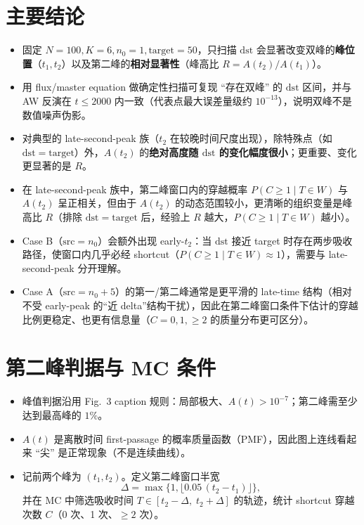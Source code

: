 \documentclass[11pt,fontset=fandol]{ctexart}
\begin{document}
\section{主要结论}
\begin{itemize}
  \item 固定 $N=100,K=6,n_0=1,\mathrm{target}=50$，只扫描 $\mathrm{dst}$ 会显著改变双峰的\textbf{峰位置}（$t_1,t_2$）以及第二峰的\textbf{相对显著性}（峰高比 $R=A(t_2)/A(t_1)$）。
  \item 用 flux/master equation 做确定性扫描可复现 ``存在双峰'' 的 $\mathrm{dst}$ 区间，并与 AW 反演在 $t\le2000$ 内一致（代表点最大误差量级约 $10^{-13}$），说明双峰不是数值噪声伪影。
  \item 对典型的 late-second-peak 族（$t_2$ 在较晚时间尺度出现），除特殊点（如 $\mathrm{dst}=\mathrm{target}$）外，$A(t_2)$ 的\textbf{绝对高度随 $\mathrm{dst}$ 的变化幅度很小}；更重要、变化更显著的是 $R$。
  \item 在 late-second-peak 族中，第二峰窗口内的穿越概率 $P(C\ge1\mid T\in W)$ 与 $A(t_2)$ 呈正相关，但由于 $A(t_2)$ 的动态范围较小，更清晰的组织变量是峰高比 $R$（排除 $\mathrm{dst}=\mathrm{target}$ 后，经验上 $R$ 越大，$P(C\ge1\mid T\in W)$ 越小）。
  \item Case B（$\mathrm{src}=n_0$）会额外出现 early-$t_2$：当 $\mathrm{dst}$ 接近 target 时存在两步吸收路径，使窗口内几乎必经 shortcut（$P(C\ge1\mid T\in W)\approx 1$），需要与 late-second-peak 分开理解。
  \item Case A（$\mathrm{src}=n_0+5$）的第一/第二峰通常是更平滑的 late-time 结构（相对不受 early-peak 的“近 delta”结构干扰），因此在第二峰窗口条件下估计的穿越比例更稳定、也更有信息量（$C=0,1,\ge2$ 的质量分布更可区分）。
\end{itemize}

\section{第二峰判据与 MC 条件}
\begin{itemize}
  \item 峰值判据沿用 Fig.~3 caption 规则：局部极大、$A(t)>10^{-7}$；第二峰需至少达到最高峰的 $1\%$。
  \item $A(t)$ 是离散时间 first-passage 的概率质量函数（PMF），因此图上连线看起来 ``尖'' 是正常现象（不是连续曲线）。
  \item 记前两个峰为 $(t_1,t_2)$。定义第二峰窗口半宽
  \[
    \Delta=\max\{1,\lfloor 0.05\,(t_2-t_1)\rfloor\},
  \]
  并在 MC 中筛选吸收时间 $T\in[t_2-\Delta,\;t_2+\Delta]$ 的轨迹，统计 shortcut 穿越次数 $C$（0 次、1 次、$\ge2$ 次）。
\end{itemize}
\end{document}
